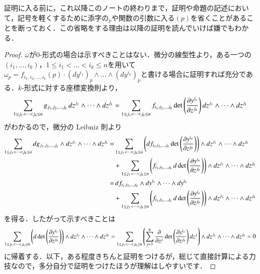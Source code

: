 証明に入る前に，これ以降このノートの終わりまで，証明や命題の記述において，記号を軽くするために添字の$_p$や関数の引数に入る$(p)$を省くことがあることを断っておく．この省略をする理由は以降の証明を読んでいけば嫌でもわかる．

\begin{proof}
$\omega$が0-形式の場合は示すべきことはない．微分の線型性より，ある一つの$(i_1, \dots, i_k)$，$1 \leq i_1 < \dots < i_k \leq n$を用いて$\omega_p = f_{i_1,i_2,\dots,i_k}(p) \cdot \left( dy^{i_1} \right)_p \wedge \dots \wedge \left( dy^{i_k} \right)_p$と書ける場合に証明すれば充分である．$k$-形式に対する座標変換則より，
\begin{equation}
\sum_{1 \leq j_1 < \dots < j_k \leq n} g_{j_1,  j_2, \dots, j_k} \mathop{}\!d z^{j_1} \wedge \dots \wedge \mathop{}\!d z^{j_k} = \sum_{1 \leq j_1 < \dots < j_k \leq n} f_{i_1,  i_2, \dots, i_k} \det \left( \frac{\partial y^{i_a}}{\partial z^{j_b}} \right) \mathop{}\!d z^{j_1} \wedge \dots \wedge \mathop{}\!d z^{j_k} 
\end{equation}がわかるので，微分の Leibniz 則より
\begin{align}
\sum_{1 \leq j_1 < \dots < j_k \leq n} \dif g_{j_1,  j_2, \dots, j_k} \wedge \dif z^{j_1} \wedge \dots \wedge \dif z^{j_k} =& \sum_{1 \leq j_1 < \dots < j_k \leq n} \left( \dif f_{i_1,  i_2, \dots, i_k} \det \left( \frac{\partial y^{i_a}}{\partial z^{j_b}} \right) \right) \wedge \dif z^{j_1} \wedge \dots \wedge \dif z^{j_k} \\
&+ \sum_{1 \leq j_1 < \dots < j_k \leq n} \left( f_{i_1,  i_2, \dots, i_k} \dif \det \left( \frac{\partial y^{i_a}}{\partial z^{j_b}} \right) \right) \wedge \dif z^{j_1} \wedge \dots \wedge \dif z^{j_k} \\
=& \dif f_{i_1,  i_2, \dots, i_k} \wedge \dif y^{i_1} \wedge \dots \wedge \dif y^{i_k} \\
&+ \sum_{1 \leq j_1 < \dots < j_k \leq n} \left( f_{i_1,  i_2, \dots, i_k} \dif \det \left( \frac{\partial y^{i_a}}{\partial z^{j_b}} \right) \right) \wedge \dif z^{j_1} \wedge \dots \wedge \dif z^{j_k} 
\end{align}を得る．したがって示すべきことは
\begin{equation}
\sum_{1 \leq j_1 < \dots < j_k \leq n} \left( \mathop{}\!d \det \left( \frac{\partial y^{i_a}}{\partial z^{j_b}} \right) \right) \wedge \mathop{}\!d z^{j_1} \wedge \dots \wedge \mathop{}\!d z^{j_k} = \sum_{1 \leq j_1 < \dots < j_k \leq n} \left( \sum_{j=1}^n \frac{\partial}{\partial z^j} \det \left( \frac{\partial y^{i_a}}{\partial z^{j_b}} \right) \mathop{}\!d z^j \right) \wedge \mathop{}\!d z^{j_1} \wedge \dots \wedge \mathop{}\!d z^{j_k} = 0
\end{equation}に帰着する．以下，ある程度きちんと証明をつけるが，総じて直接計算による力技なので，多分自分で証明をつけたほうが理解はしやすいです．


\end{proof}
